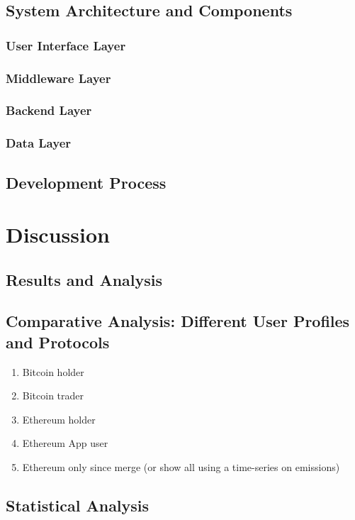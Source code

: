 \documentclass[11pt]{report}
\begin{document}
\section{System Architecture and Components}
\subsection{User Interface Layer}
\subsection{Middleware Layer}
\subsection{Backend Layer}
\subsection{Data Layer}
\section{Development Process}

\chapter{Discussion}
\section{Results and Analysis}



\newpage



\section{Comparative Analysis: Different User Profiles and Protocols}
\begin{enumerate}
    \item Bitcoin holder
    \item Bitcoin trader
    \item Ethereum holder
    \item Ethereum App user
    \item Ethereum only since merge (or show all using a time-series on emissions)
\end{enumerate}

\section{Statistical Analysis}
\end{document}
